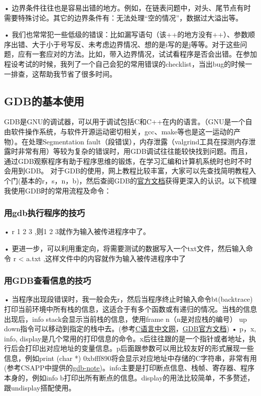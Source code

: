 \documentclass[UTF8]{ctexart}
\begin{document}
• 边界条件往往也是容易出错的地方。例如，在链表问题中，对头、尾节点有时需要特殊讨论。其它的边界条件有：无法处理“空的情况”，数据过大溢出等。

• 我们也常常犯一些低级的错误：比如漏写语句（该++的地方没有++）、参数顺序出错、大于小于号写反、未考虑边界情况、想的是i写的是j等等。对于这些问题，应有一套应对的方法。比如，带入边界情况，试试看程序是否会出错。在参加程设考试的时候，我列了一个自己会犯的常用错误的checklist，当出bug的时候一一排查，这帮助我节省了很多时间。

\subsection{GDB的基本使用}
GDB是GNU的调试器，可以用于调试包括C和C++在内的语言。（GNU是一个自由软件操作系统，与软件开源运动密切相关，gcc、make等也是这一运动的产物）。在处理Segmentation fault（段错误），内存泄露（valgrind工具在探测内存泄露时非常有用）等较为复杂的错误时，用GDB调试往往能较快找到问题。而且，通过GDB观察程序有助于程序思维的锻炼，在学习汇编和计算机系统时也时不时会用到GDB。
对于GDB的使用，网上教程比较丰富，大家可以先查找简明教程入个门(基本的r，s，n，b)，然后查阅GDB的\href{https://sourceware.org/gdb/current/onlinedocs/gdb.html/index.html}{官方文档}获得更深入的认识。以下梳理我使用GDB时的常用流程及命令：

\subsubsection{用gdb执行程序的技巧}
• r 1 2 3 ,则1 2 3就作为输入被传进程序中了。

• 更进一步，可以利用重定向，将需要测试的数据写入一个txt文件，然后输入命令 r < a.txt ,这样文件中的内容就作为输入被传进程序中了

\subsubsection{用GDB查看信息的技巧}
• 当程序出现段错误时，我一般会先r，然后当程序终止时输入命令bt(backtrace)打印当前环境中所有栈的信息，这适合于有多个函数或有递归的情况。当栈的信息出现后，info stack会显示当前栈的信息，使用frame n（n是对应栈的编号） up down指令可以移动到指定的栈中去。(参考\href{https://c.biancheng.net/view/8282.html}{C语言中文网}，\href{https://sourceware.org/gdb/current/onlinedocs/gdb.html/Stack.html#Stack}{GDB官方文档})
• p，x, info, display是几个常用的打印信息的命令。x后往往跟的是一个指针或者地址，执行后会打印出对应地址的变量信息。p后面跟参数可以用比较友好的形式展现一些信息，例如print (char *) 0xbfff890将会显示对应地址中存储的C字符串，非常有用(参考CSAPP中提供的\href{http://www.csapp.cs.cmu.edu/3e/docs/gdbnotes-x86-64.pdf}{gdb-note})。info主要是打印断点信息、栈帧、寄存器、程序本身的，例如info b打印出所有断点的信息。display的用法比较简单，不多赘述，跟undisplay搭配使用。
\end{document}
